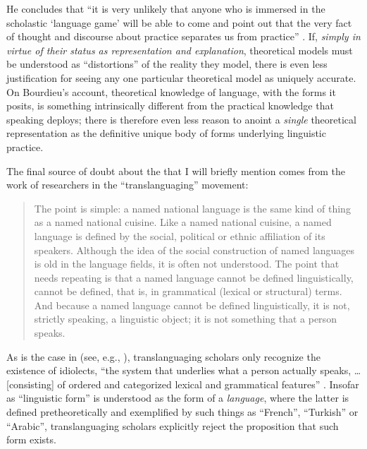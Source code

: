 \documentclass[output=paper]{langscibook}
\begin{document}
\noindent He concludes that ``it is very unlikely that anyone who is immersed in the scholastic `language game' will be able to come and point out that the very fact of thought and discourse about practice separates us from practice'' \citep[52]{Bourdieu20031997}. If, \emph{simply in virtue of their status as representation and explanation}, theoretical models must be understood as ``distortions'' of the reality they model, there is even less justification for seeing any one particular theoretical model as uniquely accurate. On Bourdieu's account, theoretical knowledge of language, with the forms it posits, is something intrinsically different from the practical knowledge that speaking deploys; there is therefore even less reason to anoint a \emph{single} theoretical representation as the definitive unique body of forms underlying linguistic practice.

The final source of doubt about the  that I will briefly mention comes from the work of researchers in the ``translanguaging'' movement:

\begin{quotation}
The point is simple: a named national language is the same kind of thing as a named national cuisine. Like a named national cuisine, a named language is defined by the social, political or ethnic affiliation of its speakers. Although the idea of the social construction of named languages is old in the language fields, it is often not understood. The point that needs repeating is that a named language cannot be defined linguistically, cannot be defined, that is, in grammatical (lexical or structural) terms. And because a named language cannot be defined linguistically, it is not, strictly speaking, a linguistic object; it is not something that a person speaks. \citep[286]{OtheguyReid2015}
\end{quotation}

\noindent As is the case in  (see, e.g., \citealt{Chomsky2000horizons}), translanguaging scholars only recognize the existence of idiolects, ``the system that underlies what a person actually speaks, … [consisting] of ordered and categorized lexical and grammatical features'' \citep[289]{OtheguyReid2015}. Insofar as ``linguistic form'' is understood as the form of a \emph{language}, where the latter is defined pretheoretically and exemplified by such things as ``French'', ``Turkish'' or ``Arabic'', translanguaging scholars explicitly reject the proposition that such form exists.
\end{document}
